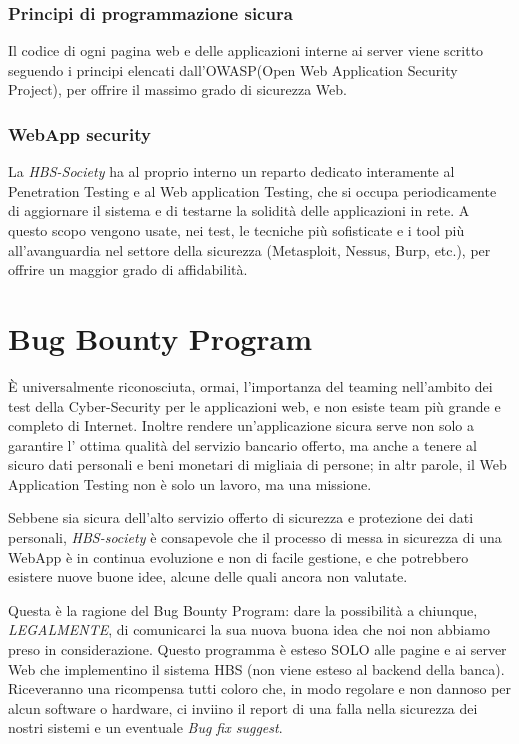 	\subsubsection{Principi di programmazione sicura}
Il codice di ogni pagina web e delle applicazioni interne ai server viene scritto seguendo i principi elencati dall'OWASP(Open Web Application Security Project), per offrire il massimo grado di sicurezza Web.
	\subsubsection{WebApp security}
La \emph{HBS-Society} ha al proprio interno un reparto dedicato interamente al Penetration Testing e al Web application Testing, che si occupa periodicamente di aggiornare il sistema e di testarne la solidità delle applicazioni in rete.
A questo scopo vengono usate, nei test, le tecniche più sofisticate e i tool più all'avanguardia nel settore della sicurezza (Metasploit, Nessus, Burp, etc.), per offrire un maggior grado di affidabilità.





\section{Bug Bounty Program}
\`E universalmente riconosciuta, ormai, l'importanza del teaming nell'ambito dei test della Cyber-Security per le applicazioni web, e non esiste team più grande e completo di Internet. Inoltre rendere un'applicazione sicura  serve non solo a  garantire l' ottima qualità del servizio bancario offerto, ma anche a tenere al sicuro dati personali e beni monetari di migliaia di persone; in altr parole, il Web Application Testing non è solo un lavoro, ma una missione.

Sebbene sia sicura dell'alto servizio offerto di sicurezza e protezione dei dati personali, \emph{HBS-society} è consapevole che il processo di messa in sicurezza di una WebApp è in continua evoluzione e non di facile gestione, e che potrebbero esistere nuove buone idee, alcune delle quali ancora non valutate.

Questa è la ragione del Bug Bounty Program: dare la possibilità a chiunque, \emph{LEGALMENTE}, di comunicarci la sua nuova buona idea che noi non abbiamo preso in considerazione. Questo programma è esteso SOLO alle pagine e ai server Web che implementino il sistema HBS (non viene esteso al backend della banca). Riceveranno una ricompensa tutti coloro che, in modo regolare e non dannoso per alcun software o hardware, ci inviino il report di una falla nella sicurezza dei nostri sistemi e un eventuale \emph{Bug fix suggest}.
